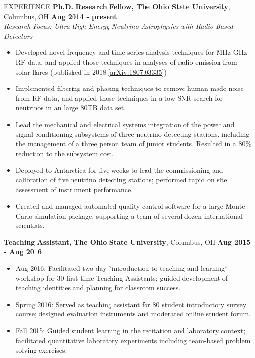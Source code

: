 \documentclass{resume} %
\begin{document}
\begin{rSection}{EXPERIENCE}
{\bf Ph.D. Research Fellow, The Ohio State University}, Columbus, OH \hfill {\bf Aug 2014 - present}\\
{\em Research Focus: Ultra-High Energy Neutrino Astrophysics with Radio-Based Detectors}
\begin{itemize}
\vspace*{.05in}
\item Developed novel frequency and time-series analysis techniques for MHz-GHz RF data, and applied those techniques in analyses of radio emission from solar flares (published in 2018 \href{https://arxiv.org/abs/1807.03335}{[arXiv:1807.03335]})
\item Implemented filtering and phasing techniques to remove human-made noise from RF data, and applied those techniques in a low-SNR search for neutrinos in an large 80TB data set. 
\item Lead the mechanical and electrical systems integration of the power and signal conditioning subsystems of three neutrino detecting stations, including the management of a three person team of junior students. Resulted in a 80\% reduction to the subsystem cost.
\item Deployed to Antarctica for five weeks to lead the commissioning and calibration of five neutrino detecting stations; performed rapid on site assessment of instrument performance.
\item Created and managed automated quality control software for a large Monte Carlo simulation package, supporting a team of several dozen international scientists.
\end{itemize}

{\bf Teaching Assistant, The Ohio State University}, Columbus, OH \hfill {\bf Aug 2015 - Aug 2016}
\begin{itemize}
\item Aug 2016: Facilitated two-day ``introduction to teaching and learning`` workshop for 30 first-time Teaching Assistants; guided development of teaching identities and planning for classroom success.
\item Spring 2016: Served as teaching assistant for 80 student introductory survey course; designed evaluation instruments and moderated online student forum.
\item Fall 2015: Guided student learning in the recitation and laboratory context; facilitated quantitative laboratory experiments including team-based problem solving exercises.

\end{itemize}

\end{rSection}
\end{document}
